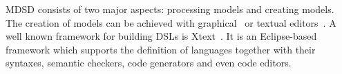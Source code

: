 MDSD consists of two major aspects: processing models and creating models.
The creation of models can be achieved with graphical~\cite{Kolovos:2009:RLA:1564600.1564699, Biermann:2006:GDI:2087202.2087244} or textual editors~\cite{Merkle:2010:TMT:1869542.1869564}.
A well known framework for building DSLs is Xtext~\cite{Eysholdt:2010:XIY:1869542.1869625}.
It is an Eclipse-based framework which supports the definition of languages together with their syntaxes, semantic checkers, code generators and even code editors.
